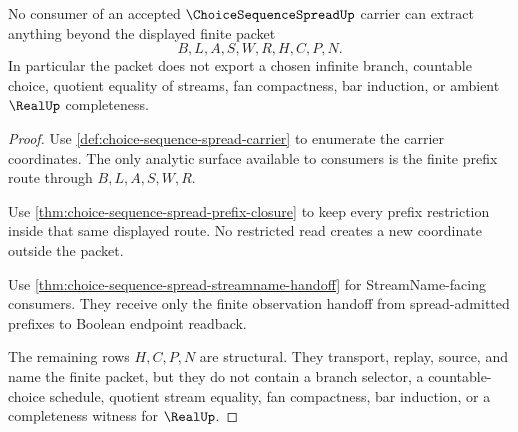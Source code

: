 \begin{theorem}
\label{thm:choice-sequence-spread-nonescape}
No consumer of an accepted $\ChoiceSequenceSpreadUp$ carrier can extract
anything beyond the displayed finite packet
$$
B,L,A,S,W,R,H,C,P,N .
$$
In particular the packet does not export a chosen infinite branch, countable
choice, quotient equality of streams, fan compactness, bar induction, or
ambient $\RealUp$ completeness.
\end{theorem}
\begin{proof}
Use \autoref{def:choice-sequence-spread-carrier} to enumerate the carrier
coordinates. The only analytic surface available to consumers is the finite
prefix route through $B,L,A,S,W,R$.

Use \autoref{thm:choice-sequence-spread-prefix-closure} to keep every prefix
restriction inside that same displayed route. No restricted read creates a new
coordinate outside the packet.

Use \autoref{thm:choice-sequence-spread-streamname-handoff} for
StreamName-facing consumers. They receive only the finite observation handoff
from spread-admitted prefixes to Boolean endpoint readback.

The remaining rows $H,C,P,N$ are structural. They transport, replay, source, and
name the finite packet, but they do not contain a branch selector, a
countable-choice schedule, quotient stream equality, fan compactness, bar
induction, or a completeness witness for $\RealUp$.
\end{proof}


\begin{closurestatus}{\ChoiceSequenceSpreadUp}
  \theoryclosure{\seedClosure}
  \formalstatus{\unformalizedV}
\end{closurestatus}

